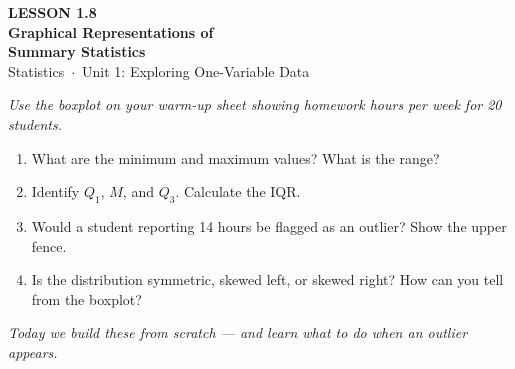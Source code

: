 \documentclass[aspectratio=169, 11pt]{beamer}
\begin{document}
{
\begin{frame}[plain]
  \vspace{2.8cm}
  \hspace{0.55cm}%
  \begin{minipage}{0.9\textwidth}
    {\color{goldacc}\bfseries\small LESSON 1.8}\\[0.5cm]
    {\color{white}\bfseries\LARGE Graphical Representations of\\[0.25cm]
      Summary Statistics}\\[1.4cm]
    {\color{skymid}\small Statistics~$\cdot$~Unit 1: Exploring One-Variable Data}
  \end{minipage}
\end{frame}
}

{
\begin{frame}[t, plain]
  \vspace{1em}%
  \hspace{0.55cm}%
  \begin{minipage}{0.9\textwidth}
    \small
    \textit{Use the boxplot on your warm-up sheet showing homework hours per week
    for 20 students.}

    \vspace{0.5em}
    \begin{enumerate}
      \setlength{\itemsep}{0.6em}\setlength{\topsep}{0em}
      \item What are the minimum and maximum values? What is the range?
      \item Identify $Q_1$, $M$, and $Q_3$. Calculate the IQR.
      \item Would a student reporting 14 hours be flagged as an outlier?
            Show the upper fence.
      \item Is the distribution symmetric, skewed left, or skewed right?
            How can you tell from the boxplot?
    \end{enumerate}
    \vspace{0.4cm}
    {\color{navy}\itshape\small
      Today we build these from scratch --- and learn what to do when an
      outlier appears.}
  \end{minipage}
\end{frame}
}
\end{document}
